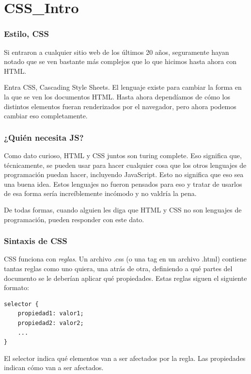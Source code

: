 \section{CSS_Intro}\label{sec:CSS_Intro}

\begin{frame}
    \frametitle{Estilo, CSS}
    
    Si entraron a cualquier sitio web de los últimos 20 años, seguramente hayan notado 
    que se ven bastante más complejos que lo que hicimos hasta ahora con HTML.

    Entra CSS, Cascading Style Sheets. El lenguaje existe para cambiar la 
    forma en la que se ven los documentos HTML. Hasta ahora dependíamos de 
    cómo los distintos elementos fueran renderizados por el navegador, pero 
    ahora podemos cambiar eso completamente.

\end{frame}

\begin{frame}
    \frametitle{¿Quién necesita JS?}

    Como dato curioso, HTML y CSS juntos son turing complete. Eso significa que, 
    técnicamente, se pueden usar para hacer cualquier cosa que los otros lenguajes 
    de programación puedan hacer, incluyendo JavaScript. Esto no significa que 
    eso sea una buena idea. Estos lenguajes no fueron pensados para eso y tratar 
    de usarlos de esa forma sería increíblemente incómodo y no valdría la pena.

    De todas formas, cuando alguien les diga que HTML y CSS no son lenguajes de 
    programación, pueden responder con este dato.

\end{frame}

\begin{frame}[fragile]
    \frametitle{Sintaxis de CSS}
    
    CSS funciona con \emph{reglas}. Un archivo .css (o una tag  
    en un archivo .html) contiene tantas reglas como uno quiera, una atrás de 
    otra, definiendo a qué partes del documento se le deberían aplicar qué 
    propiedades. Estas reglas siguen el siguiente formato:

    \begin{lstlisting}
selector {
    propiedad1: valor1;
    propiedad2: valor2;
    ...
}
    \end{lstlisting}

    El selector indica qué elementos van a ser afectados por la regla. Las 
    propiedades indican cómo van a ser afectados.

\end{frame}

